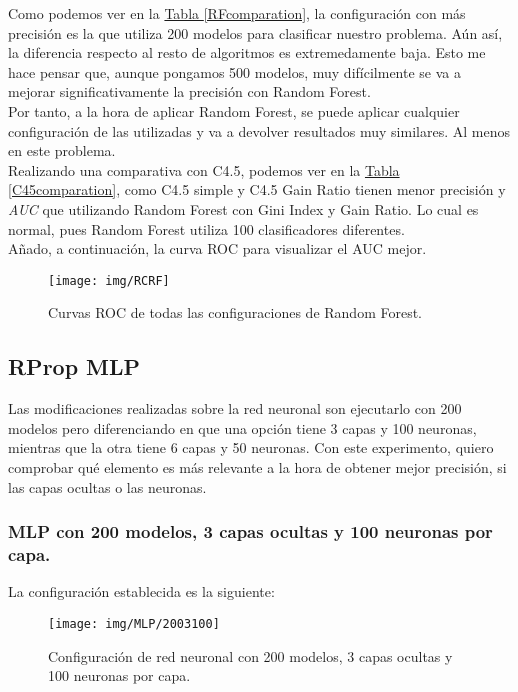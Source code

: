 \documentclass[paper=a4, fontsize=12pt]{article} %
\numberwithin{equation}{section} %
\numberwithin{figure}{section} %
\numberwithin{table}{section} %
\begin{document}
Como podemos ver en la \hyperref[RFcomparation]{Tabla \ref*{RFcomparation}}, la configuración con más precisión es la que utiliza 200 modelos para clasificar nuestro problema. Aún así, la diferencia respecto al resto de algoritmos es extremedamente baja. Esto me hace pensar que, aunque pongamos 500 modelos, muy difícilmente se va a mejorar significativamente la precisión con Random Forest.\\

Por tanto, a la hora de aplicar Random Forest, se puede aplicar cualquier configuración de las utilizadas y va a devolver resultados muy similares. Al menos en este problema.\\

Realizando una comparativa con C4.5, podemos ver en la \hyperref[C45comparation]{Tabla \ref*{C45comparation}}, como C4.5 simple y C4.5 Gain Ratio tienen menor precisión y \textit{AUC} que utilizando Random Forest con Gini Index y Gain Ratio. Lo cual es normal, pues Random Forest utiliza 100 clasificadores diferentes.\\


Añado, a continuación, la curva ROC para visualizar el AUC mejor.

	\begin{figure}[H]
	  \centering
	  \texttt{[image: img/RCRF]}
	  \caption{Curvas ROC de todas las configuraciones de Random Forest.}
	  \label{curva_roc_rf}
	\end{figure}
\subsection {RProp MLP}

Las modificaciones realizadas sobre la red neuronal son ejecutarlo con 200 modelos pero diferenciando en que una opción tiene 3 capas y 100 neuronas, mientras que la otra tiene 6 capas y 50 neuronas. Con este experimento, quiero comprobar qué elemento es más relevante a la hora de obtener mejor precisión, si las capas ocultas o las neuronas.

\subsubsection {MLP con 200 modelos, 3 capas ocultas y 100 neuronas por capa.}
La configuración establecida es la siguiente:

	\begin{figure}[H]
	  \centering
	  \texttt{[image: img/MLP/2003100]}
	  \caption{Configuración de red neuronal con 200 modelos, 3 capas ocultas y 100 neuronas por capa.}
	  \label{NN2003}
	\end{figure}
\end{document}
